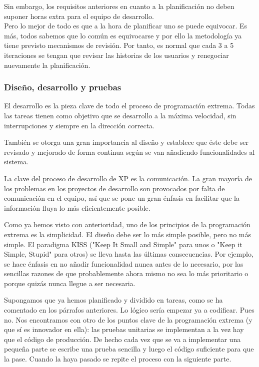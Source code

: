 \documentclass[12pt]{book} %
\begin{document}
			 Sin embargo, los requisitos anteriores en cuanto a la planificación no deben suponer horas extra para el equipo de desarrollo.\\
			 
			 Pero lo mejor de todo es que a la hora de planificar uno se puede equivocar. Es más, todos sabemos que lo común es equivocarse 
			 y por ello la metodología ya tiene previsto mecanismos de revisión. Por tanto, es normal que cada 3 a 5 iteraciones se tengan 
			 que revisar las historias de los usuarios y renegociar nuevamente la planificación.\\
			 
		\subsubsection{Diseño, desarrollo y pruebas}
			El desarrollo es la pieza clave de todo el proceso de programación extrema. Todas las tareas tienen como objetivo que se desarrollo 
			a la máxima velocidad, sin interrupciones y siempre en la dirección correcta. 
			
			También se otorga una gran importancia al diseño y establece que éste debe ser revisado y mejorado de forma continua según se van 
			añadiendo funcionalidades al sistema.
			
			La clave del proceso de desarrollo de XP es la comunicación. La gran mayoría de los problemas en los proyectos de desarrollo son 
			provocados por falta de comunicación en el equipo, así que se pone un gran énfasis en facilitar que la información fluya lo más 
			eficientemente posible. 
			
			Como ya hemos visto con anterioridad, uno de los principios de la programación extrema es la simplicidad. El diseño debe ser lo 
			más simple posible, pero no más simple. El paradigma KISS ("Keep It Small and Simple" para unos o "Keep it Simple, Stupid" para otros) 
			se lleva hasta las últimas consecuencias. Por ejemplo, se hace énfasis en no añadir funcionalidad nunca antes de lo necesario, por las 
			sencillas razones de que probablemente ahora mismo no sea lo más prioritario o porque quizás nunca llegue a ser necesaria.
			
			
			Supongamos que ya hemos planificado y dividido en tareas, como se ha comentado en los párrafos anteriores. Lo lógico sería empezar 
			ya a codificar. Pues no. Nos encontramos con otro de los puntos clave de la programación extrema (y que sí es innovador en ella): 
			las pruebas unitarias se implementan a la vez hay que el código de producción. De hecho cada vez que se va a implementar una pequeña
			parte se escribe una prueba sencilla y luego el código suficiente para que la pase. Cuando la haya pasado se repite el proceso con 
			la siguiente parte.
			
\end{document}

